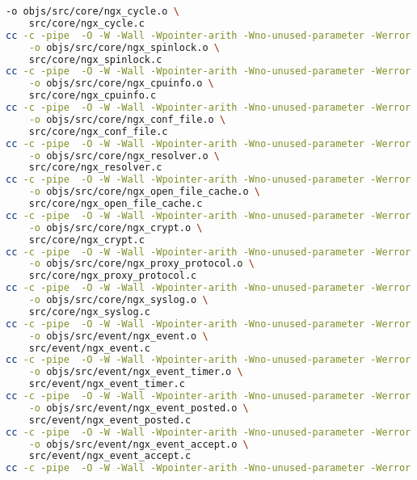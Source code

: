 \begin{lstlisting}[language=bash]
	-o objs/src/core/ngx_cycle.o \
	src/core/ngx_cycle.c
cc -c -pipe  -O -W -Wall -Wpointer-arith -Wno-unused-parameter -Werror -g  -I src/core -I src/event -I src/event/modules -I src/os/unix -I objs \
	-o objs/src/core/ngx_spinlock.o \
	src/core/ngx_spinlock.c
cc -c -pipe  -O -W -Wall -Wpointer-arith -Wno-unused-parameter -Werror -g  -I src/core -I src/event -I src/event/modules -I src/os/unix -I objs \
	-o objs/src/core/ngx_cpuinfo.o \
	src/core/ngx_cpuinfo.c
cc -c -pipe  -O -W -Wall -Wpointer-arith -Wno-unused-parameter -Werror -g  -I src/core -I src/event -I src/event/modules -I src/os/unix -I objs \
	-o objs/src/core/ngx_conf_file.o \
	src/core/ngx_conf_file.c
cc -c -pipe  -O -W -Wall -Wpointer-arith -Wno-unused-parameter -Werror -g  -I src/core -I src/event -I src/event/modules -I src/os/unix -I objs \
	-o objs/src/core/ngx_resolver.o \
	src/core/ngx_resolver.c
cc -c -pipe  -O -W -Wall -Wpointer-arith -Wno-unused-parameter -Werror -g  -I src/core -I src/event -I src/event/modules -I src/os/unix -I objs \
	-o objs/src/core/ngx_open_file_cache.o \
	src/core/ngx_open_file_cache.c
cc -c -pipe  -O -W -Wall -Wpointer-arith -Wno-unused-parameter -Werror -g  -I src/core -I src/event -I src/event/modules -I src/os/unix -I objs \
	-o objs/src/core/ngx_crypt.o \
	src/core/ngx_crypt.c
cc -c -pipe  -O -W -Wall -Wpointer-arith -Wno-unused-parameter -Werror -g  -I src/core -I src/event -I src/event/modules -I src/os/unix -I objs \
	-o objs/src/core/ngx_proxy_protocol.o \
	src/core/ngx_proxy_protocol.c
cc -c -pipe  -O -W -Wall -Wpointer-arith -Wno-unused-parameter -Werror -g  -I src/core -I src/event -I src/event/modules -I src/os/unix -I objs \
	-o objs/src/core/ngx_syslog.o \
	src/core/ngx_syslog.c
cc -c -pipe  -O -W -Wall -Wpointer-arith -Wno-unused-parameter -Werror -g  -I src/core -I src/event -I src/event/modules -I src/os/unix -I objs \
	-o objs/src/event/ngx_event.o \
	src/event/ngx_event.c
cc -c -pipe  -O -W -Wall -Wpointer-arith -Wno-unused-parameter -Werror -g  -I src/core -I src/event -I src/event/modules -I src/os/unix -I objs \
	-o objs/src/event/ngx_event_timer.o \
	src/event/ngx_event_timer.c
cc -c -pipe  -O -W -Wall -Wpointer-arith -Wno-unused-parameter -Werror -g  -I src/core -I src/event -I src/event/modules -I src/os/unix -I objs \
	-o objs/src/event/ngx_event_posted.o \
	src/event/ngx_event_posted.c
cc -c -pipe  -O -W -Wall -Wpointer-arith -Wno-unused-parameter -Werror -g  -I src/core -I src/event -I src/event/modules -I src/os/unix -I objs \
	-o objs/src/event/ngx_event_accept.o \
	src/event/ngx_event_accept.c
cc -c -pipe  -O -W -Wall -Wpointer-arith -Wno-unused-parameter -Werror -g  -I src/core -I src/event -I src/event/modules -I src/os/unix -I objs \

\end{lstlisting}
